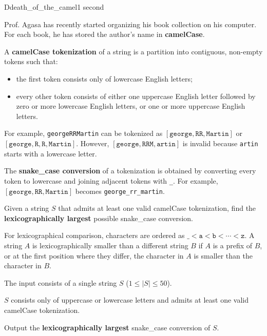 \begin{problem}{D}{death\_of\_the\_camel}{1 second}

\noindent
Prof. Agasa has recently started organizing his book collection on his computer. For each book, he has stored the author's name in \textbf{camelCase}.

\noindent
A \textbf{camelCase tokenization} of a string is a partition into contiguous, non-empty tokens such that:

\begin{itemize}
    \item the first token consists only of lowercase English letters;
    \item every other token consists of either one uppercase English letter followed by zero or more lowercase English letters, or one or more uppercase English letters.
\end{itemize}

\noindent
For example, \texttt{georgeRRMartin} can be tokenized as $[\texttt{george}, \texttt{RR}, \texttt{Martin}]$ or $[\texttt{george}, \texttt{R}, \texttt{R}, \texttt{Martin}]$. However, $[\texttt{george}, \texttt{RRM}, \texttt{artin}]$ is invalid because \texttt{artin} starts with a lowercase letter.

\noindent
The \textbf{snake\_case conversion} of a tokenization is obtained by converting every token to lowercase and joining adjacent tokens with \texttt{\_}. For example, $[\texttt{george}, \texttt{RR}, \texttt{Martin}]$ becomes \texttt{george\_rr\_martin}.

\noindent
Given a string $S$ that admits at least one valid camelCase tokenization, find the \textbf{lexicographically largest} possible snake\_case conversion.

\noindent
For lexicographical comparison, characters are ordered as
$\texttt{\_} < \texttt{a} < \texttt{b} < \cdots < \texttt{z}$.
A string $A$ is lexicographically smaller than a different string $B$ if $A$ is a prefix of $B$, or at the first position where they differ, the character in $A$ is smaller than the character in $B$.

\InputFile

\noindent
The input consists of a single string $S$ ($1 \le |S| \le 50$).

\noindent
$S$ consists only of uppercase or lowercase letters and admits at least one valid camelCase tokenization.

\OutputFile

\noindent
Output the \textbf{lexicographically largest} snake\_case conversion of $S$.

\Examples

\begin{example}
\end{example}

\pagebreak

\end{problem}
